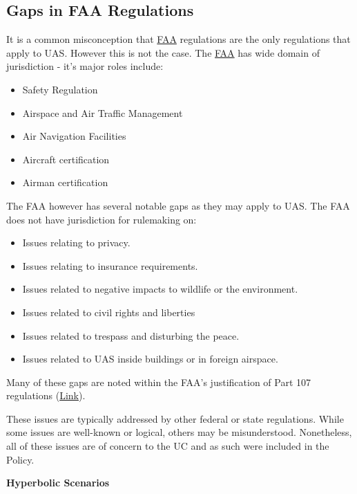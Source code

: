 \documentclass[
]{book}
\providecommand{\tightlist}{%
  \setlength{\itemsep}{0pt}\setlength{\parskip}{0pt}}
\begin{document}
\hypertarget{gaps-in-faa-regulations}{%
\subsection{Gaps in FAA Regulations}\label{gaps-in-faa-regulations}}

It is a common misconception that \protect\hyperlink{FAA}{FAA} regulations are the only regulations that apply to UAS. However this is not the case. The \protect\hyperlink{FAA}{FAA} has wide domain of jurisdiction - it's major roles include:

\begin{itemize}
\tightlist
\item
  Safety Regulation
\item
  Airspace and Air Traffic Management
\item
  Air Navigation Facilities
\item
  Aircraft certification
\item
  Airman certification
\end{itemize}

The FAA however has several notable gaps as they may apply to UAS. The FAA does not have jurisdiction for rulemaking on:

\begin{itemize}
\tightlist
\item
  Issues relating to privacy.
\item
  Issues relating to insurance requirements.
\item
  Issues related to negative impacts to wildlife or the environment.
\item
  Issues related to civil rights and liberties
\item
  Issues related to trespass and disturbing the peace.
\item
  Issues related to UAS inside buildings or in foreign airspace.
\end{itemize}

Many of these gaps are noted within the FAA's justification of Part 107 regulations (\href{https://www.faa.gov/uas/media/RIN_2120-AJ60_Clean_Signed.pdf}{Link}).

These issues are typically addressed by other federal or state regulations. While some issues are well-known or logical, others may be misunderstood. Nonetheless, all of these issues are of concern to the UC and as such were included in the Policy.

\textbf{Hyperbolic Scenarios}
\end{document}
